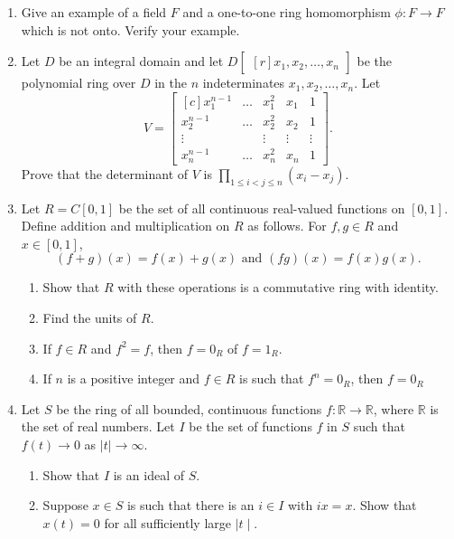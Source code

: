 \documentclass{article}
\theoremstyle{definition}
\newcommand{\R}{\mathbb{R}}
\newcommand{\mat}[1]{\begin{bmatrix*}[r] #1 \end{bmatrix*}}
\begin{document}
\begin{enumerate}
            \item Give an example of a field $F$ and a one-to-one ring homomorphism $\phi : F\to F$ which is not onto. Verify your example.
            
            \item Let $D$ be an integral domain and let $D\mat{x_1, x_2, \hdots,  x_n}$ be the polynomial ring over $D$ in the $n$ indeterminates $x_1, x_2, \hdots, x_n$. Let \[V=\begin{bmatrix*}[c] x^{n-1}_1 & \hdots & x^2_1 & x_1 & 1 \\ x^{n-1}_2 & \hdots & x^2_2 & x_2 & 1 \\ \vdots & & \vdots & \vdots & \vdots \\ x^{n-1}_n & \hdots & x^2_n & x_n & 1 \end{bmatrix*}.\]  Prove that the determinant of $V$ is $\prod_{1\leq i <j \leq n} (x_i-x_j)$.
            
            \item Let $R=C[0,1]$ be the set of all continuous real-valued functions on $[0,1]$. Define addition and multiplication on $R$ as follows. For $f,g\in R$ and $x\in [0,1]$, \[(f+g)(x)=f(x)+g(x) \text{ and } (fg)(x)=f(x)g(x).\]
            
            \begin{enumerate}
                \item Show that $R$ with these operations is a commutative ring with identity.
                \item Find the units of $R$.
                \item If $f\in R$ and $f^2=f$, then $f=0_R$ of $f=1_R$.
                \item If $n$ is a positive integer and $f\in R$ is such that $f^n=0_R$, then $f=0_R$
            \end{enumerate}

            \item Let $S$ be the ring of all bounded, continuous functions $f:\R \to \R$, where $\R$ is the set of real numbers. Let $I$ be the set of functions $f$ in $S$ such that $f(t) \to 0$ as $\mid t\mid  \to \infty $.
            
            \begin{enumerate}
                \item Show that $I$ is an ideal of $S$.
                \item Suppose $x\in S$ is such that there is an $i\in I$ with $ix=x$. Show that $x(t)=0$ for all sufficiently large $\mid t\mid $.
            \end{enumerate}


\end{enumerate}
\end{document}
